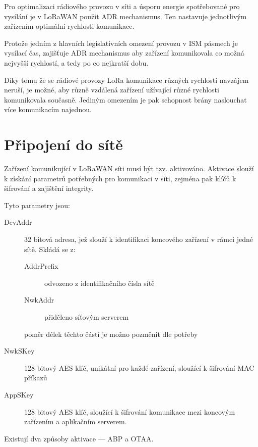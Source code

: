     Pro optimalizaci rádiového provozu v síti a úsporu energie spotřebované 
    pro vysílání je v LoRaWAN použit ADR mechanismus.
    Ten nastavuje jednotlivým zařízením optimální rychlosti komunikace.

    Protože jedním z hlavních legislativních omezení provozu v ISM pásmech je 
    vysílací čas, zajišťuje ADR mechanismus aby zařízení komunikovala co možná
    nejvyšší rychlostí, a tedy po co nejkratší dobu.
    
    Díky tomu že se rádiové provozy LoRa komunikace různých rychlostí navzájem
    neruší, je možné, aby různě vzdálená zařízení užívající různé rychlosti
    komunikovala současně.
    Jediným omezením je pak schopnost brány naslouchat více komunikacím 
    najednou.

\section{Připojení do sítě}\label{sec:act}
    \label{subsubsec:LoRaWAN_activation}

    Zařízení komunikující v LoRaWAN síti musí být tzv. aktivováno. 
    Aktivace slouží k získání parametrů potřebných pro komunikaci v síti, 
    zejména pak klíčů k šifrování a zajištění integrity.

    Tyto parametry jsou:

    \begin{description}
        \item [DevAddr] 32 bitová adresa, jež slouží k identifikaci koncového
            zařízení v rámci jedné sítě. Skládá se z:
            \begin{description}
                \item [AddrPrefix] odvozeno z identifikačního čísla sítě
                \item [NwkAddr] přiděleno síťovým serverem
            \end{description}
            poměr délek těchto částí je možno pozměnit dle potřeby
        \item [NwkSKey] 128 bitový AES klíč, unikátní pro každé zařízení,
            sloužící k šifrování MAC příkazů
        \item [AppSKey] 128 bitový AES klíč, sloužící k šifrování komunikace 
            mezi koncovým zařízením a aplikačním serverem.
    \end{description}

    Existují dva způsoby aktivace --- ABP a OTAA.

